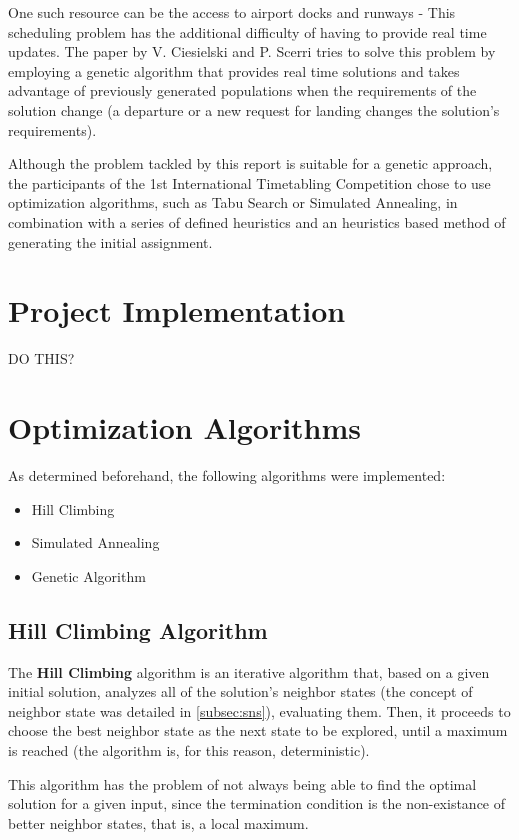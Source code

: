 \documentclass[conference]{IEEEtran}
\begin{document}
One such resource can be the access to airport docks and runways - This scheduling problem has the additional difficulty of having to provide real time updates. The paper by V. Ciesielski and P. Scerri \cite{air} tries to solve this problem by employing a genetic algorithm that provides real time solutions and takes advantage of previously generated populations when the requirements of the solution change (a departure or a new request for landing changes the solution's requirements).

Although the problem tackled by this report is suitable for a genetic approach, the participants of the 1st International Timetabling Competition chose to use optimization algorithms, such as Tabu Search \cite{sol2} or Simulated Annealing\cite{sol1}, in combination with a series of defined heuristics and an heuristics based method of generating the initial assignment. 

\section{Project Implementation}

DO THIS?

\section{Optimization Algorithms}

As determined beforehand, the following algorithms were implemented:
\begin{itemize}
    \item Hill Climbing
    \item Simulated Annealing
    \item Genetic Algorithm
\end{itemize}

\subsection{Hill Climbing Algorithm} \label{subsec:hca}

The \textbf{Hill Climbing} algorithm is an iterative algorithm that, based on a given initial solution, analyzes all of the solution's neighbor states (the concept of neighbor state was detailed in \autoref{subsec:sns}), evaluating them. Then, it proceeds to choose the best neighbor state as the next state to be explored, until a maximum is reached (the algorithm is, for this reason, deterministic).

This algorithm has the problem of not always being able to find the optimal solution for a given input, since the termination condition is the non-existance of better neighbor states, that is, a local maximum.
\end{document}

